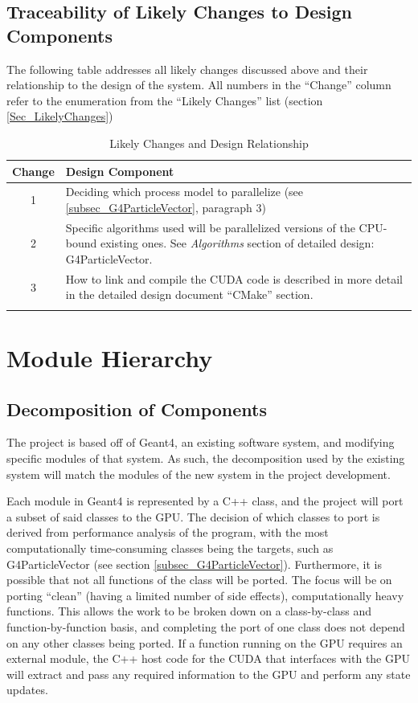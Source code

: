 \documentclass[12pt]{article}
\begin{document}
\subsection{Traceability of Likely Changes to Design Components}
The following table addresses all likely changes discussed above and their relationship to the design of the system. All numbers in the ``Change'' column refer to the enumeration from the ``Likely Changes'' list (section \ref{Sec_LikelyChanges})

\begin{center}
\begin{longtable}{c >{\raggedright\arraybackslash}p{}}

\caption{Likely Changes and Design Relationship}\label{Table_LikelyChangesAndDesign}
\\\toprule
\bf Change & \bf Design Component\\\toprule
\arrayrulecolor{lightgray}

1 & Deciding which process model to parallelize (see \ref{subsec_G4ParticleVector}, paragraph 3)\\\hline
2 & Specific algorithms used will be parallelized versions of the CPU-bound existing ones. See \emph{Algorithms} section of detailed design: G4ParticleVector.\\\hline
3 & How to link and compile the CUDA code is described in more detail in the detailed design document ``CMake'' section.\\
\arrayrulecolor{black}
\bottomrule
\end{longtable}
\end{center}

\section{Module Hierarchy}%
\subsection{Decomposition of Components}
The project is based off of Geant4, an existing software system, and modifying specific modules of that system. As such, the decomposition used by the existing system will match the modules of the new system in the project development.

Each module in Geant4 is represented by a C++ class, and the project will port a subset of said classes to the GPU. The decision of which classes to port is derived from performance analysis of the program, with the most computationally time-consuming classes being the targets, such as G4ParticleVector (see section \ref{subsec_G4ParticleVector}). Furthermore, it is possible that not all functions of the class will be ported. The focus will be on porting ``clean'' (having a limited number of side effects), computationally heavy functions. This allows the work to be broken down on a class-by-class and function-by-function basis, and completing the port of one class does not depend on any other classes being ported. If a function running on the GPU requires an external module, the C++ host code for the CUDA that interfaces with the GPU will extract and pass any required information to the GPU and perform any state updates.
\end{document}
